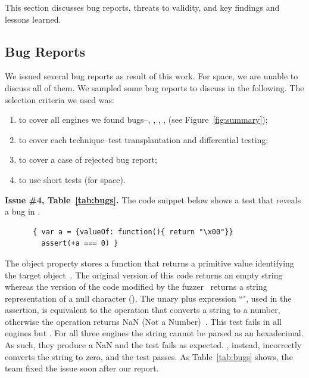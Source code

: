 \documentclass[smallextended]{svjour3}
\begin{document}
This section discusses bug reports, threats to validity, and key
findings and lessons learned.

\subsection{Bug Reports}

We issued several bug reports as result of this work. For space, we
are unable to discuss all of them. We sampled some bug reports to
discuss in the following. The selection criteria we used was:
\begin{enumerate}
\item to cover all engines we found bugs--\chakra, \hermes, \jsc,
  \smonkey, \veight (see Figure~\ref{fig:summary});
\item to cover each technique--test transplantation and differential
  testing;
\item to cover a case of rejected bug report;
\item to use short tests (for space).
\end{enumerate}


\sloppy
\vspace{1ex}\noindent\textbf{Issue \#4, Table~\ref{tab:bugs}.} The
code snippet below shows a test that reveals a bug in \textbf{\chakra}.

\begin{figure}[h!]
  \vspace{-1ex}
  \centering
  \scriptsize
  \begin{lstlisting}
 { var a = {valueOf: function(){ return "\x00"}}
   assert(+a === 0) }
  \end{lstlisting}
  \normalsize
  \vspace{-1ex}
\end{figure}

The object property  stores a function that returns a
primitive value identifying the target object~\cite{valueof}. The
original version of this code returns an empty string whereas the
version of the code modified by the \radamsa{} fuzzer~\cite{radamsa}
returns a string representation of a null character
(). The unary plus expression
``", used in the assertion, is equivalent to the operation
 that converts a string to a number,
otherwise the operation returns NaN (Not a
Number)~\cite{unary-plus}. This test fails in all engines but
\chakra{}. For all three engines the string cannot be parsed as an
hexadecimal. As such, they produce a NaN and the test fails as
expected. \chakra{}, instead, incorrectly converts the string to zero,
and the test passes. As Table~\ref{tab:bugs} shows, the \chakra{} team
fixed the issue soon after our report.
\end{document}
